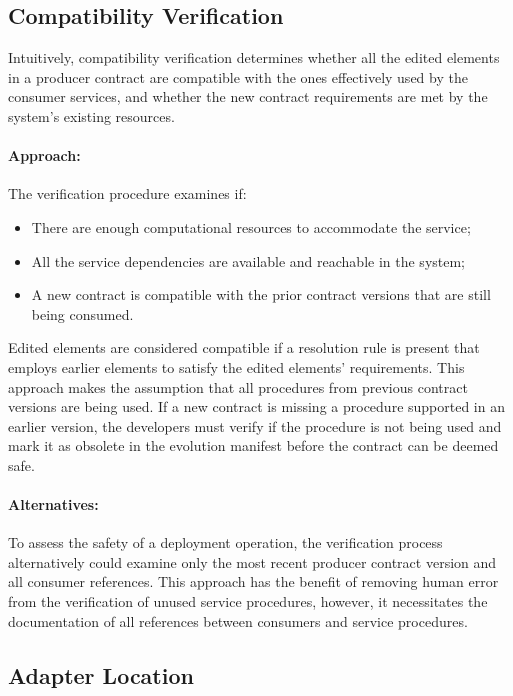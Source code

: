 \subsection{Compatibility Verification} %
\label{sec:compatibility_verification_design}

Intuitively, compatibility verification determines whether
all the edited elements in a producer contract are compatible with the ones effectively
used by the consumer services, and whether the new contract requirements are met
by the system’s existing resources.
\newpage
\paragraph{Approach:}The verification procedure examines if:
\begin{itemize}
    \setlength\itemsep{0em}
    \item There are enough computational resources to accommodate the service;
    \item All the service dependencies are available and reachable in the system;
    \item A new contract is compatible with the prior contract versions that are still being consumed.
\end{itemize}

Edited elements are considered compatible if a resolution rule is present that employs earlier elements to satisfy the edited elements' requirements.
This approach makes the assumption that all procedures from previous contract versions are being used.
If a new contract is missing a procedure supported in an earlier version,
the developers must verify if the procedure is not being used and mark it as obsolete in the evolution manifest before the contract can be deemed safe.

\paragraph{Alternatives:}
To assess the safety of a deployment operation, the verification process alternatively could examine only the most recent producer contract version and all consumer references.
This approach has the benefit of removing human error from the verification of unused service procedures, however, it necessitates the documentation of all references between consumers and service procedures.

\subsection{Adapter Location} %
\label{sec:adapter_location}

